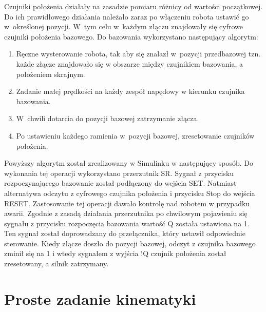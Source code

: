 Czujniki położenia działały na zasadzie pomiaru różnicy od wartości początkowej. Do ich prawidłowego działania należało zaraz po włączeniu robota ustawić go w~określonej pozycji. W~tym celu w~każdym złączu znajdowały się cyfrowe czujniki położenia bazowego. Do bazowania wykorzystano następujący algorytm:
\begin{enumerate}
\item Ręczne wysterowanie robota, tak aby się znalazł w~pozycji przedbazowej tzn. każde złącze znajdowało się w obszarze między czujnikiem bazowania, a położeniem skrajnym.
\item Zadanie małej prędkości na każdy zespół napędowy w kierunku czujnika bazowania.
\item W~chwili dotarcia do pozycji bazowej zatrzymanie złącza.
\item Po ustawieniu każdego ramienia w~pozycji bazowej, zresetowanie czujników położenia.
\end{enumerate}
Powyższy algorytm został zrealizowany w Simulinku w następujący sposób.
Do wykonania tej operacji wykorzystano przerzutnik SR. Sygnał z przycisku rozpoczynającego bazowanie został podłączony do wejścia SET. Natmiast alternatywa odczytu z cyfrowego czujnika położenia i przycisku Stop do wejścia RESET. Zastosowanie tej operacji dawało kontrolę nad robotem w przypadku awarii. Zgodnie z zasadą działania przerzutnika po chwilowym pojawieniu się sygnału z przycisku rozpoczęcia bazowania wartość Q została ustawiona na 1. Ten sygnał został doprowadzany do przełącznika, który ustawił odpowiednie sterowanie. Kiedy złącze doszło do pozycji bazowej, odczyt z czujnika bazowego zminił się na 1 i wtedy sygnałem z wyjścia !Q czujnik położenia został zresetowany, a silnik zatrzymany.

\section{Proste zadanie kinematyki}

